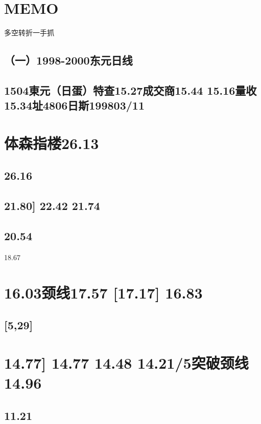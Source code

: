 \documentclass{article}
\begin{document}
\section{MEMO}

\clearpage

多空转折一手抓

\subsection{（一）1998-2000东元日线}

\subsection{1504東元（日蛋）特查15.27成交商15.44 15.16量收15.34址4806日斯199803/11}

\section{体森指楼26.13}

\subsection{26.16}

\subsection{21.80] 22.42 21.74}

\subsection{20.54}

18.67

\section{16.03颈线17.57 [17.17] 16.83}

\subsection{[5,29]}

\section{14.77] 14.77 14.48 14.21/5突破颈线14.96}

\subsection{11.21}
\end{document}
